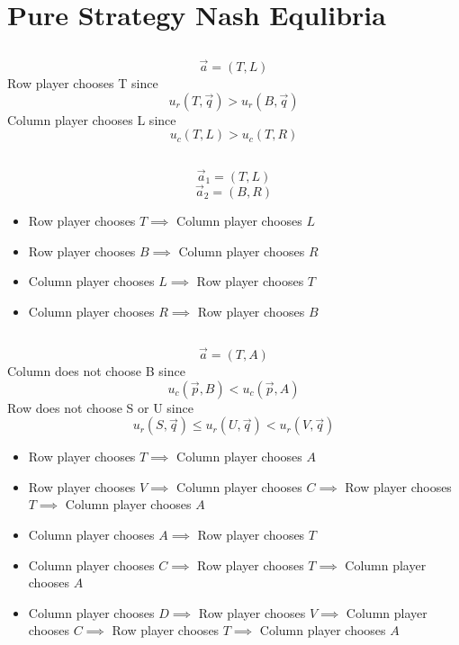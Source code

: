 




\section{Pure Strategy Nash Equlibria}

\subsection{}
\[\vec{a}=(T,L)\]
Row player chooses T since
\[u_r(T,\vec{q})>u_r(B,\vec{q})\]
Column player chooses L since
\[u_c(T,L)>u_c(T,R)\]

\subsection{}
\[\vec{a}_1=(T,L)\]
\[\vec{a}_2=(B,R)\]
\begin{itemize}
    \item Row player chooses $T \implies$ Column player chooses $L$
    \item Row player chooses $B \implies$ Column player chooses $R$
    \item Column player chooses $L \implies$ Row player chooses $T$
    \item Column player chooses $R \implies$ Row player chooses $B$
\end{itemize}

\subsection{}
\[\vec{a}=(T,A)\]
Column does not choose B since
\[u_c(\vec{p},B)<u_c(\vec{p},A)\]
Row does not choose S or U since
\[u_r(S,\vec{q})\leq u_r(U,\vec{q})<u_r(V,\vec{q})\]
\begin{itemize}
    \item Row player chooses $T \implies$ Column player chooses $A$
    \item Row player chooses $V \implies$ Column player chooses $C \implies$
    Row player chooses $T \implies$ Column player chooses $A$
    \item Column player chooses $A \implies$ Row player chooses $T$
    \item Column player chooses $C \implies$ Row player chooses $T \implies$
    Column player chooses $A$
    \item Column player chooses $D \implies$ Row player chooses $V \implies$
    Column player chooses $C \implies$ Row player chooses $T \implies$
    Column player chooses $A$
\end{itemize}

